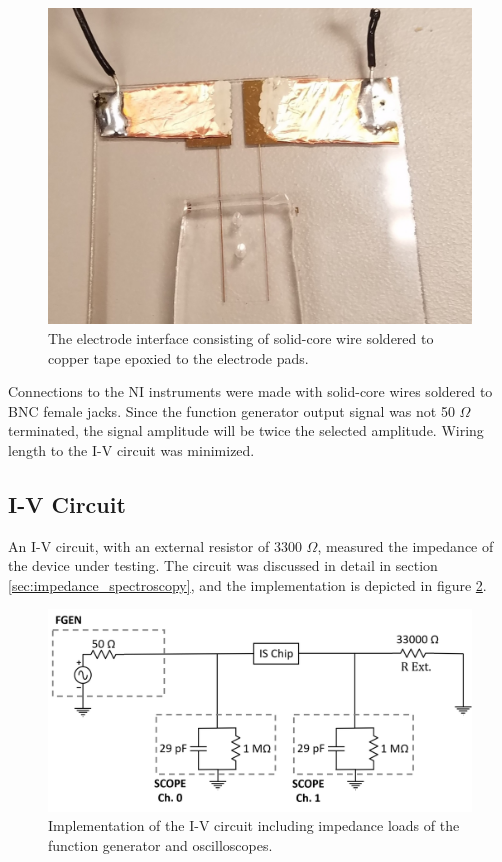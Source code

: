 \begin{figure}[h]
    \centering
    \includegraphics[width=\textwidth]{images/electrod_interface.jpg}
    \caption[Impedance spectroscope electrode interface.]{The electrode interface consisting of solid-core wire soldered to copper tape epoxied to the electrode pads.}
    \label{fig:electrode_interface}
\end{figure}
\newpage

\par Connections to the NI instruments were made with solid-core wires soldered to BNC female jacks. Since the function generator output signal was not 50 $\Omega$ terminated, the signal amplitude will be twice the selected amplitude. Wiring length to the I-V circuit was minimized. 

\subsection*{I-V Circuit}
\par An I-V circuit, with an external resistor of 3300 $\Omega$, measured the impedance of the device under testing. The circuit was discussed in detail in section \ref{sec:impedance_spectroscopy}, and the implementation is depicted in figure \ref{fig:I-V_implementation}.

\begin{figure}[h]
    \centering
    \includegraphics[width=\textwidth]{images/method_I-V.png}
    \caption[I-V circuit implementation.]{Implementation of the I-V circuit including impedance loads of the function generator and oscilloscopes.}
    \label{fig:I-V_implementation}
\end{figure}

